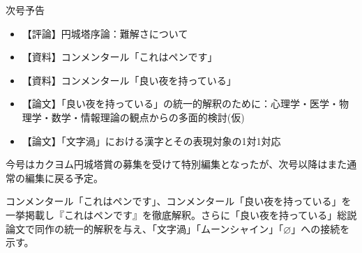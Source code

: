 \documentclass[10pt, a5paper, twoside]{jsarticle}
\theoremstyle{definition}
\begin{document}
	\begin{center}

		{\Large 次号予告}

			\vspace{10mm}

		\begin{itemize}

			\item 【評論】円城塔序論：難解さについて

				\vspace{3mm}

			\item 【資料】コンメンタール「これはペンです」

				\vspace{3mm}

			\item 【資料】コンメンタール「良い夜を持っている」

				\vspace{3mm}

			\item 【論文】「良い夜を持っている」の統一的解釈のために：心理学・医学・物理学・数学・情報理論の観点からの多面的検討(仮)

				\vspace{3mm}

			\item 【論文】「文字渦」における漢字とその表現対象の1対1対応
		
		\end{itemize}


	\end{center}

	\vspace{15mm}

	\begin{screen}
		
		今号はカクヨム円城塔賞の募集を受けて特別編集となったが、次号以降はまた通常の編集に戻る予定。

		コンメンタール「これはペンです」、コンメンタール「良い夜を持っている」を一挙掲載し『これはペンです』を徹底解釈。さらに「良い夜を持っている」総説論文で同作の統一的解釈を与え、「文字渦」「ムーンシャイン」「$\varnothing$」への接続を示す。

	\end{screen}

	\newpage
\end{document}
